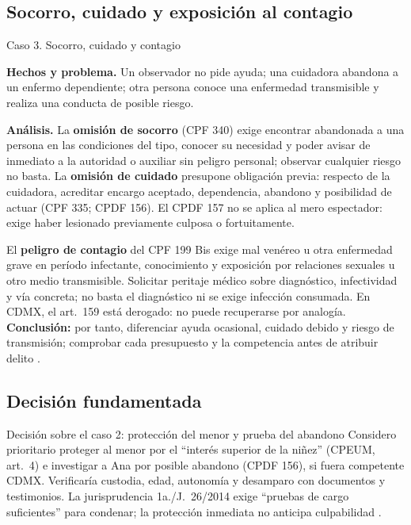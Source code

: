 \documentclass[spanish,letterpaper,oneside]{article}
\newcommand{\fichacaso}[1]{%
  \begin{tcolorbox}[colback=white,colframe=casoverde!25,
    boxrule=0.4pt,arc=0.6mm,left=1.6mm,right=1.6mm,top=1mm,bottom=1mm,
    before skip=0pt,after skip=3pt]
    #1
  \end{tcolorbox}%
}
\begin{document}
\clearpage
\subsection*{Socorro, cuidado y exposición al contagio}
\begin{casoestudio}{Caso 3. Socorro, cuidado y contagio}
\fichacaso{\textbf{Hechos y problema.} Un observador no pide ayuda; una cuidadora abandona a un enfermo dependiente; otra persona conoce una enfermedad transmisible y realiza una conducta de posible riesgo.}
\textbf{Análisis.} La \textbf{omisión de socorro} (CPF 340) exige encontrar abandonada a una persona en las condiciones del tipo, conocer su necesidad y poder avisar de inmediato a la autoridad o auxiliar sin peligro personal; observar cualquier riesgo no basta. La \textbf{omisión de cuidado} presupone obligación previa: respecto de la cuidadora, acreditar encargo aceptado, dependencia, abandono y posibilidad de actuar (CPF 335; CPDF 156). El CPDF 157 no se aplica al mero espectador: exige haber lesionado previamente culposa o fortuitamente.

El \textbf{peligro de contagio} del CPF 199 Bis exige mal venéreo u otra enfermedad grave en período infectante, conocimiento y exposición por relaciones sexuales u otro medio transmisible. Solicitar peritaje médico sobre diagnóstico, infectividad y vía concreta; no basta el diagnóstico ni se exige infección consumada. En CDMX, el art.~159 está derogado: no puede recuperarse por analogía. \textbf{Conclusión:} por tanto, diferenciar ayuda ocasional, cuidado debido y riesgo de transmisión; comprobar cada presupuesto y la competencia antes de atribuir delito \citep{cpfS4Vigente,cpdfS4Vigente}.
\end{casoestudio}

\subsection*{Decisión fundamentada}
\begin{casoestudio}{Decisión sobre el caso 2: protección del menor y prueba del abandono}
Considero prioritario proteger al menor por el ``interés superior de la niñez'' (CPEUM, art.~4) e investigar a Ana por posible abandono (CPDF 156), si fuera competente CDMX. Verificaría custodia, edad, autonomía y desamparo con documentos y testimonios. La jurisprudencia 1a./J.~26/2014 exige ``pruebas de cargo suficientes'' para condenar; la protección inmediata no anticipa culpabilidad \citep{cpeumS4Vigente,cpdfS4Vigente,scjnPresuncionS4}.
\end{casoestudio}
\end{document}
